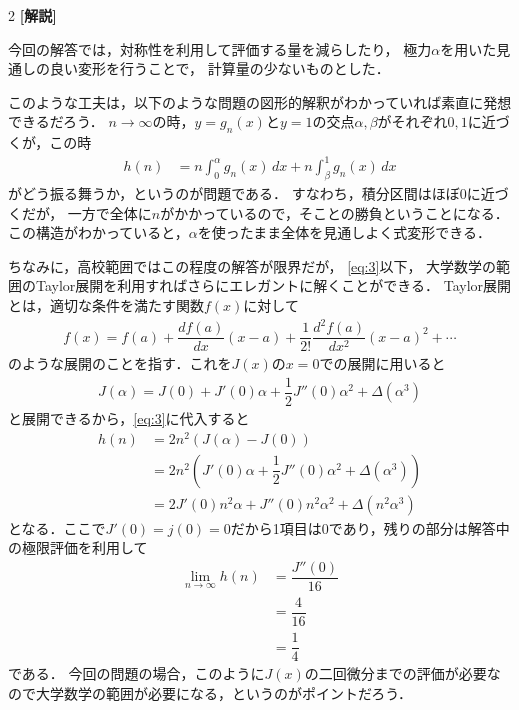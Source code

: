 \documentclass[../../main.tex]{subfiles}
\begin{document}
\begin{multicols}{2}
  {\bf [解説]}

  今回の解答では，対称性を利用して評価する量を減らしたり，
  極力$\alpha$を用いた見通しの良い変形を行うことで，
  計算量の少ないものとした．

  このような工夫は，以下のような問題の図形的解釈がわかっていれば素直に発想できるだろう．
  $n\to\infty$の時，$y=g_n(x)$と$y=1$の交点$\alpha,\beta$がそれぞれ$0,1$に近づくが，この時
  \begin{align}
    h(n)
    & = n \int_0^\alpha g_n(x) \, dx + n \int_\beta^1 g_n(x) \, dx
  \end{align}
  がどう振る舞うか，というのが問題である．
  すなわち，積分区間はほぼ$0$に近づくだが，
  一方で全体に$n$がかかっているので，そことの勝負ということになる．
  この構造がわかっていると，$\alpha$を使ったまま全体を見通しよく式変形できる．

  ちなみに，高校範囲ではこの程度の解答が限界だが，
  \cref{eq:3}以下，
  大学数学の範囲のTaylor展開を利用すればさらにエレガントに解くことができる．
  Taylor展開とは，適切な条件を満たす関数$f(x)$に対して
  \begin{align}
    f(x) = f(a) + \dfrac{df(a)}{dx}\left(x-a\right)+\dfrac{1}{2!}\dfrac{d^2f(a)}{dx^2}\left(x-a\right)^2+\cdots
  \end{align}
  のような展開のことを指す．これを$J(x)$の$x=0$での展開に用いると
  \begin{align}
    J(\alpha)= J(0)+J'(0)\alpha+\dfrac{1}{2}J''(0)\alpha^2+\Delta(\alpha^3)
  \end{align}
  と展開できるから，\cref{eq:3}に代入すると
  \begin{align}
    h(n)
    & = 2n^2\left(J(\alpha) - J(0) \right)                                      \\
    & = 2n^2\left(J'(0)\alpha+\dfrac{1}{2}J''(0)\alpha^2+\Delta(\alpha^3)\right) \\
    & = 2J'(0)n^2\alpha + J''(0)n^2\alpha^2+\Delta(n^2\alpha^3)
  \end{align}
  となる．ここで$J'(0)=j(0)=0$だから1項目は$0$であり，残りの部分は解答中の極限評価を利用して
  \begin{align}
    \lim_{n\to\infty}h(n)
    & = \dfrac{J''(0)}{16} \\
    & = \dfrac{4}{16}      \\
    & = \dfrac{1}{4}
  \end{align}
  である．
  今回の問題の場合，このように$J(x)$の二回微分までの評価が必要なので大学数学の範囲が必要になる，というのがポイントだろう．


\end{multicols}
\end{document}
